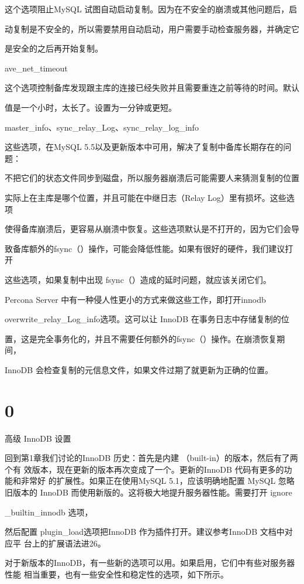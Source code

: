 这个选项阻止MySQL 试图自动启动复制。因为在不安全的崩溃或其他问题后，启

动复制是不安全的，所以需要禁用自动启动，用户需要手动检查服务器，并确定它

是安全的之后再开始复制。

ave\_net\_timeout

这个选项控制备库发现跟主库的连接已经失败并且需要重连之前等待的时间。默认

值是一个小时，太长了。设置为一分钟或更短。

master\_info、sync\_relay\_Log、sync\_relay\_log\_info

这些选项，在MySQL 5.5以及更新版本中可用，解决了复制中备库长期存在的问题：

不把它们的状态文件同步到磁盘，所以服务器崩溃后可能需要人来猜测复制的位置

实际上在主库是哪个位置，并且可能在中继日志（Relay Log）里有损坏。这些选项

使得备库崩溃后，更容易从崩溃中恢复。这些选项默认是不打开的，因为它们会导

致备库额外的fsync（）操作，可能会降低性能。如果有很好的硬件，我们建议打开

这些选项，如果复制中出现 fsync（）造成的延时问题，就应该关闭它们。

Percona Server 中有一种侵人性更小的方式来做这些工作，即打开innodb

overwrite\_relay\_Log\_info选项。这可以让 InnoDB 在事务日志中存储复制的位

置，这是完全事务化的，并且不需要任何额外的fsync（）操作。在崩溃恢复期间，

InnoDB 会检查复制的元信息文件，如果文件过期了就更新为正确的位置。

\section{0}
高级 InnoDB 设置

回到第1章我们讨论的InnoDB 历史：首先是内建 （built-in）的版本，然后有了两个有
效版本，现在更新的版本再次变成了一个。更新的InnoDB 代码有更多的功能和非常好
的扩展性。如果正在使用MySQL 5.1，应该明确地配置 MySQL 忽略旧版本的 InnoDB
而使用新版的。这将极大地提升服务器性能。需要打开 ignore

\_builtin\_innodb 选项，

然后配置 plugin\_load选项把InnoDB 作为插件打开。建议参考InnoDB 文档中对应平
台上的扩展语法进26。

对于新版本的InnoDB，有一些新的选项可以用。如果启用，它们中有些对服务器性能
相当重要，也有一些安全性和稳定性的选项，如下所示。


